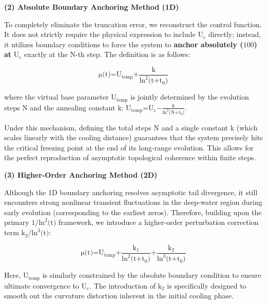 \textbf{(2) Absolute Boundary Anchoring Method (1D)}

To completely eliminate the truncation error, we reconstruct the control
function. It does not strictly require the physical expression to
include \(\text{U}_{\text{c}}\) directly; instead, it utilizes boundary
conditions to force the system to \textbf{anchor absolutely
(}\(\text{100}\)\textbf{) at} \(\text{U}_{\text{c}}\) exactly at the
\(\text{N}\)-th step. The definition is as follows:

\[\text{μ}\text{(}\text{t}\text{)=}\text{U}_{\text{temp}}\text{+}\frac{\text{k}}{\text{ln}^{\text{2}}\text{(}\text{t}\text{+}\text{t}_{\text{0}}\text{)}}\]

where the virtual base parameter \(\text{U}_{\text{temp}}\) is jointly
determined by the evolution steps \(\text{N}\) and the annealing
constant \(\text{k}\):
\(\text{U}_{\text{temp}}\text{=}\text{U}_{\text{c}}\text{−}\frac{\text{k}}{\text{ln}^{\text{2}}\text{(}\text{N}\text{+}\text{t}_{\text{0}}\text{)}}\).

Under this mechanism, defining the total steps \(\text{N}\) and a single
constant \(\text{k}\) (which scales linearly with the cooling distance)
guarantees that the system precisely hits the critical freezing point at
the end of its long-range evolution. This allows for the perfect
reproduction of asymptotic topological coherence within finite steps.

\textbf{(3) Higher-Order Anchoring Method (2D)}

Although the 1D boundary anchoring resolves asymptotic tail divergence,
it still encounters strong nonlinear transient fluctuations in the
deep-water region during early evolution (corresponding to the earliest
zeros). Therefore, building upon the primary
\(\text{1/}\text{ln}^{\text{2}}\text{(}\text{t}\text{)}\) framework, we
introduce a higher-order perturbation correction term
\(\text{k}_{\text{2}}\text{/}\text{ln}^{\text{3}}\text{(}\text{t}\text{)}\):

\[\text{μ}\text{(}\text{t}\text{)=}\text{U}_{\text{temp}}\text{+}\frac{\text{k}_{\text{1}}}{\text{ln}^{\text{2}}\text{(}\text{t}\text{+}\text{t}_{\text{0}}\text{)}}\text{+}\frac{\text{k}_{\text{2}}}{\text{ln}^{\text{3}}\text{(}\text{t}\text{+}\text{t}_{\text{0}}\text{)}}\]

Here, \(\text{U}_{\text{temp}}\) is similarly constrained by the
absolute boundary condition to ensure ultimate convergence to
\(\text{U}_{\text{c}}\). The introduction of \(\text{k}_{\text{2}}\) is
specifically designed to smooth out the curvature distortion inherent in
the initial cooling phase.

